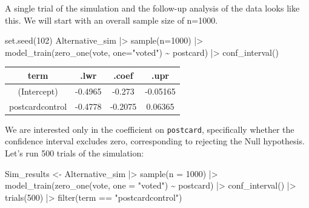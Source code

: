 \documentclass[
  letterpaper,
  DIV=11,
  numbers=noendperiod,
  oneside]{scrartcl}
\newenvironment{Shaded}{\begin{snugshade}}{\end{snugshade}}
\newcommand{\AttributeTok}[1]{\textcolor[rgb]{0.40,0.45,0.13}{#1}}
\newcommand{\DecValTok}[1]{\textcolor[rgb]{0.68,0.00,0.00}{#1}}
\newcommand{\FunctionTok}[1]{\textcolor[rgb]{0.28,0.35,0.67}{#1}}
\newcommand{\NormalTok}[1]{\textcolor[rgb]{0.00,0.23,0.31}{#1}}
\newcommand{\OtherTok}[1]{\textcolor[rgb]{0.00,0.23,0.31}{#1}}
\newcommand{\SpecialCharTok}[1]{\textcolor[rgb]{0.37,0.37,0.37}{#1}}
\newcommand{\StringTok}[1]{\textcolor[rgb]{0.13,0.47,0.30}{#1}}
\begin{document}
\begin{tcolorbox}
A single trial of the simulation and the follow-up analysis of the data
looks like this. We will start with an overall sample size of n=1000.

\begin{Shaded}
\begin{Highlighting}[]
\FunctionTok{set.seed}\NormalTok{(}\DecValTok{102}\NormalTok{)}
\NormalTok{Alternative\_sim }\SpecialCharTok{|\textgreater{}} \FunctionTok{sample}\NormalTok{(}\AttributeTok{n=}\DecValTok{1000}\NormalTok{) }\SpecialCharTok{|\textgreater{}}
  \FunctionTok{model\_train}\NormalTok{(}\FunctionTok{zero\_one}\NormalTok{(vote, }\AttributeTok{one=}\StringTok{"voted"}\NormalTok{) }\SpecialCharTok{\textasciitilde{}}\NormalTok{ postcard) }\SpecialCharTok{|\textgreater{}}
  \FunctionTok{conf\_interval}\NormalTok{()}
\end{Highlighting}
\end{Shaded}

\begin{longtable}[]{@{}cccc@{}}
\toprule\noalign{}
term & .lwr & .coef & .upr \\
\midrule\noalign{}
\endhead
\bottomrule\noalign{}
\endlastfoot
(Intercept) & -0.4965 & -0.273 & -0.05165 \\
postcardcontrol & -0.4778 & -0.2075 & 0.06365 \\
\end{longtable}

We are interested only in the coefficient on \texttt{postcard},
specifically whether the confidence interval excludes zero,
corresponding to rejecting the Null hypothesis. Let's run 500 trials of
the simulation:

\begin{Shaded}
\begin{Highlighting}[]
\NormalTok{Sim\_results }\OtherTok{\textless{}{-}}\NormalTok{ Alternative\_sim }\SpecialCharTok{|\textgreater{}} \FunctionTok{sample}\NormalTok{(}\AttributeTok{n =} \DecValTok{1000}\NormalTok{) }\SpecialCharTok{|\textgreater{}}
  \FunctionTok{model\_train}\NormalTok{(}\FunctionTok{zero\_one}\NormalTok{(vote, }\AttributeTok{one =} \StringTok{"voted"}\NormalTok{) }\SpecialCharTok{\textasciitilde{}}\NormalTok{ postcard) }\SpecialCharTok{|\textgreater{}}
  \FunctionTok{conf\_interval}\NormalTok{() }\SpecialCharTok{|\textgreater{}}
  \FunctionTok{trials}\NormalTok{(}\DecValTok{500}\NormalTok{) }\SpecialCharTok{|\textgreater{}}
  \FunctionTok{filter}\NormalTok{(term }\SpecialCharTok{==} \StringTok{"postcardcontrol"}\NormalTok{)}
\end{Highlighting}
\end{Shaded}


\end{tcolorbox}
\end{document}
